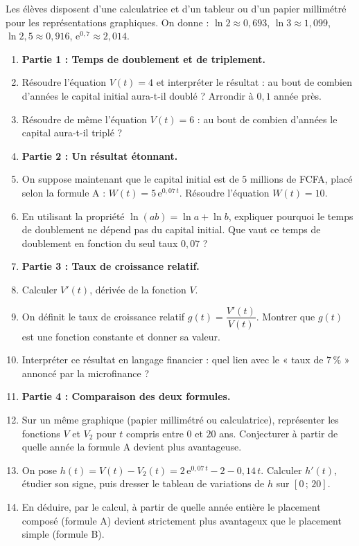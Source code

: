 \documentclass[11pt]{article}
\newcounter{popsec}
\newcounter{popsub}
\newcommand{\courssub}[1]{%
  \stepcounter{popsub}%
  \par\vspace{9pt}\noindent{\popxbold\fontsize{11.5}{13}\selectfont\color{popink}{\color{poporange}\thepopsec.\thepopsub}\hspace{6pt}#1}\par\nopagebreak\vspace{4pt}
}
\begin{document}
Les élèves disposent d'une calculatrice et d'un tableur ou d'un papier millimétré pour les représentations graphiques. On donne : $\ln 2 \approx 0{,}693$, $\ln 3 \approx 1{,}099$, $\ln 2{,}5 \approx 0{,}916$, $\mathrm{e}^{0{,}7} \approx 2{,}014$.

\courssub{Consignes}

\begin{enumerate}
\item[] \textbf{Partie 1 : Temps de doublement et de triplement.}
\item Résoudre l'équation $V(t) = 4$ et interpréter le résultat : au bout de combien d'années le capital initial aura-t-il doublé ? Arrondir à $0{,}1$ année près.
\item Résoudre de même l'équation $V(t) = 6$ : au bout de combien d'années le capital aura-t-il triplé ?

\item[] \textbf{Partie 2 : Un résultat étonnant.}
\item On suppose maintenant que le capital initial est de $5$ millions de FCFA, placé selon la formule A : $W(t) = 5\,\mathrm{e}^{0{,}07\,t}$. Résoudre l'équation $W(t) = 10$.
\item En utilisant la propriété $\ln(ab) = \ln a + \ln b$, expliquer pourquoi le temps de doublement ne dépend pas du capital initial. Que vaut ce temps de doublement en fonction du seul taux $0{,}07$ ?

\item[] \textbf{Partie 3 : Taux de croissance relatif.}
\item Calculer $V'(t)$, dérivée de la fonction $V$.
\item On définit le taux de croissance relatif $g(t) = \dfrac{V'(t)}{V(t)}$. Montrer que $g(t)$ est une fonction constante et donner sa valeur.
\item Interpréter ce résultat en langage financier : quel lien avec le « taux de $7\,\%$ » annoncé par la microfinance ?

\item[] \textbf{Partie 4 : Comparaison des deux formules.}
\item Sur un même graphique (papier millimétré ou calculatrice), représenter les fonctions $V$ et $V_2$ pour $t$ compris entre $0$ et $20$ ans. Conjecturer à partir de quelle année la formule A devient plus avantageuse.
\item On pose $h(t) = V(t) - V_2(t) = 2\,\mathrm{e}^{0{,}07\,t} - 2 - 0{,}14\,t$. Calculer $h'(t)$, étudier son signe, puis dresser le tableau de variations de $h$ sur $[0\,;\,20]$.
\item En déduire, par le calcul, à partir de quelle année entière le placement composé (formule A) devient strictement plus avantageux que le placement simple (formule B).


\end{enumerate}
\end{document}
